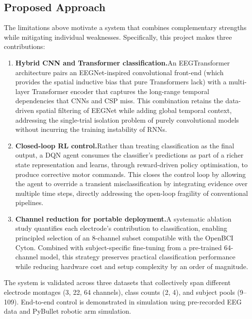 \documentclass[12pt, a4paper]{article}
\begin{document}
\subsection{Proposed Approach}

The limitations above motivate a system that combines complementary strengths while mitigating individual weaknesses. Specifically, this project makes three contributions:

\begin{enumerate}
    \item \textbf{Hybrid CNN and Transformer classification.}\quad An EEGTransformer architecture pairs an EEGNet-inspired convolutional front-end (which provides the spatial inductive bias that pure Transformers lack) with a multi-layer Transformer encoder that captures the long-range temporal dependencies that CNNs and CSP miss. This combination retains the data-driven spatial filtering of EEGNet while adding global temporal context, addressing the single-trial isolation problem of purely convolutional models without incurring the training instability of RNNs.

    \item \textbf{Closed-loop RL control.}\quad Rather than treating classification as the final output, a DQN agent consumes the classifier's predictions as part of a richer state representation and learns, through reward-driven policy optimisation, to produce corrective motor commands. This closes the control loop by allowing the agent to override a transient misclassification by integrating evidence over multiple time steps, directly addressing the open-loop fragility of conventional pipelines.

    \item \textbf{Channel reduction for portable deployment.}\quad A systematic ablation study quantifies each electrode's contribution to classification, enabling principled selection of an 8-channel subset compatible with the OpenBCI Cyton. Combined with subject-specific fine-tuning from a pre-trained 64-channel model, this strategy preserves practical classification performance while reducing hardware cost and setup complexity by an order of magnitude.
\end{enumerate}

The system is validated across three datasets that collectively span different electrode montages (3, 22, 64 channels), class counts (2, 4), and subject pools (9--109). End-to-end control is demonstrated in simulation using pre-recorded EEG data and PyBullet robotic arm simulation.
\end{document}
